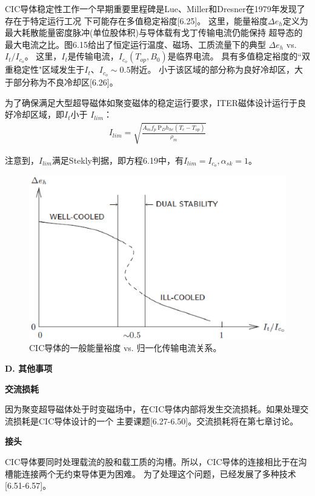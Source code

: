 CIC导体稳定性工作一个早期重要里程碑是Lue、Miller和Dresner在1979年发现了存在于特定运行工况
下可能存在多值稳定裕度[6.25]。
这里，能量裕度$\Delta e_h$定义为最大耗散能量密度脉冲(单位股体积)与导体载有戈丁传输电流仍能保持
超导态的最大电流之比。图6.15给出了恒定运行温度、磁场、工质流量下的典型
$\Delta e_h$ vs. $I_t/I_{c_o}$。
这里，$I_t$是传输电流，$I_{c_o}(T_{op},B_0)$是临界电流。
具有多值稳定裕度的``双重稳定性"区域发生于$I_t、I_{c_o}\sim 0.5$附近。
小于该区域的部分称为良好冷却区，大于部分称为不良冷却区[6.26]。

为了确保满足大型超导磁体如聚变磁体的稳定运行要求，ITER磁体设计运行于良好冷却区域，即$I_t$小于
$I_{lim}$：
\begin{align}%
I_{lim}=\sqrt{\frac{A_mf_p\ \mathrm{P}_Dh_{he}(T_c-T_{op})}{\rho_m}}
\end{align}

注意到，$I_{lim}$满足Stekly判据，即方程6.19中，有$I_{lim}=I_{c_o},\alpha_{sk}=1$。
\begin{figure}[htbp]
	\centering
	\includegraphics[scale=0.7]{chpt6/figs/fig6.15.eps}
	\caption{CIC导体的一般能量裕度 vs. 归一化传输电流关系。}
\end{figure}

\textbf{D. 其他事项}

\textbf{交流损耗}

因为聚变超导磁体处于时变磁场中，在CIC导体内部将发生交流损耗。如果处理交流损耗是CIC导体设计的一个
主要课题[6.27-6.50]。交流损耗将在第七章讨论。

\textbf{接头}

CIC导体要同时处理载流的股和载工质的沟槽。所以，CIC导体的连接相比于在沟槽能连接两个无约束导体更为困难。
为了处理这个问题，已经发展了多种技术[6.51-6.57]。


